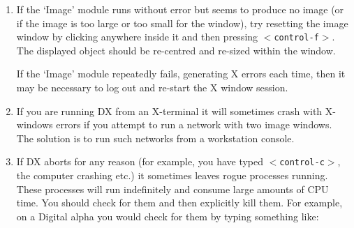 \begin{enumerate}
   where {\it x}\, is the amount of memory to be used, in Mb. Thus, for
   example, to specify a maximum of 200Mb you would type:

  \begin{quote}
   {\tt dx -memory 200}
  \end{quote}

   The most suitable value depends on the capabilities and configuration
   of your system. The following (possibly contradictory) criteria
   apply:

  \begin{itemize}

    \item try to allocate at least two or three times the total size
     of your data set,

    \item but do not allocate more than the total amount of swap space
     on your machine\footnotemark[\value{swapfoot}],

    \item finally (but not least), other users will appreciate your
     setting a small value!

  \end{itemize}

   Appendix A, {\it Using Data Explorer: Some Useful Hints}, in the
   IBM {\it User's Guide}\cite{USERG} includes a section, {\it Memory
   Use}, which contains useful hints on reducing the amount of memory
   needed by DX.

  \item If the `Image' module runs without error but seems to produce no
   image (or if the image is too large or too small for the window), try
   resetting the image window by clicking anywhere inside it and then
   pressing {\tt $<$control-f$>$}. The displayed object should be
   re-centred and re-sized within the window.

   If the `Image' module repeatedly fails, generating X errors each time,
   then it may be necessary to log out and re-start the X window session.

  \item If you are running DX from an X-terminal it will sometimes
   crash with X-windows errors if you attempt to run a network with
   two image windows. The solution is to run such networks from a
   workstation console.

  \item If DX aborts for any reason (for example, you have typed
   {\tt $<$control-c$>$}, the computer crashing etc.) it sometimes leaves
   rogue processes running. These processes will run indefinitely and
   consume large amounts of CPU time.  You should check for them and then
   explicitly kill them. For example, on a Digital alpha you would check for
   them by typing something like:


\end{enumerate}
